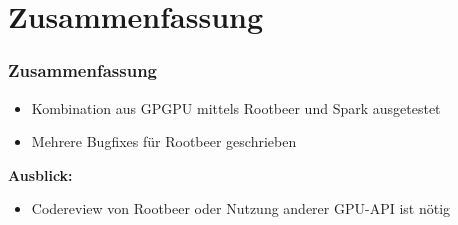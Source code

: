 \section{Zusammenfassung}
\begin{frame}
	\frametitle{Zusammenfassung}
	\begin{itemize}
		\item Kombination aus GPGPU mittels Rootbeer und Spark ausgetestet
        \item Mehrere Bugfixes für Rootbeer geschrieben
	\end{itemize}
    \textbf{Ausblick:}
    \begin{itemize}
        \item Codereview von Rootbeer oder Nutzung anderer GPU-API ist nötig

\end{itemize}
\end{frame}
